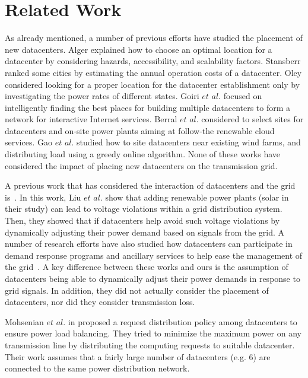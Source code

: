 \section{Related Work}
\label{sec:related}

As already mentioned, a number of previous efforts have studied the placement of new datacenters.  Alger \cite{Dalger05} explained how to choose an optimal location for a datacenter by considering hazards, accessibility, and scalability factors.  Stansberr \cite{Stansberr06} ranked some cities by estimating the annual operation costs of a datacenter.  Oley \cite{Boley09} considered looking for a proper location for the datacenter establishment only by investigating the power rates of different states.  Goiri $\textit{et al.}$ \cite{Goiri11place} focused on intelligently finding the best places for building multiple datacenters to form a network for interactive Internet services.  Berral $\textit{et al.}$ \cite{berral2014building} considered to select sites for datacenters and on-site power plants aiming at follow-the renewable cloud services.  Gao $\textit{et al.}$ \cite{gao2013answer} studied how to site datacenters near existing wind farms, and distributing load using a greedy online algorithm.  None of these works have considered the impact of placing new datacenters on the transmission grid.

A previous work that has considered the interaction of datacenters and the grid is~\cite{liu2014pricing}.  In this work, Liu $\textit{et al.}$ show that adding renewable power plants (solar in their study) can lead to voltage violations within a grid distribution system.  Then, they showed that if datacenters help avoid such voltage violations by dynamically adjusting their power demand based on signals from the grid.  A number of research efforts have also studied how datacenters can participate in demand response programs and ancillary services to help ease the management of the grid~\cite{Aikema12,AdamWierman2014}.  A key difference between these works and ours is the assumption of datacenters being able to dynamically adjust their power demands in response to grid signals.  In addition, they did not actually consider the placement of datacenters, nor did they consider transmission loss.

Mohsenian $\textit{et al.}$ in \cite{Mohsenian-Rad10grid} proposed a request distribution policy among datacenters to ensure power load balancing. They tried to minimize the maximum power on any transmission line by distributing the computing requests to suitable datacenter. Their work assumes that a fairly large number of datacenters (e.g. 6) are connected to the same power distribution network.   

